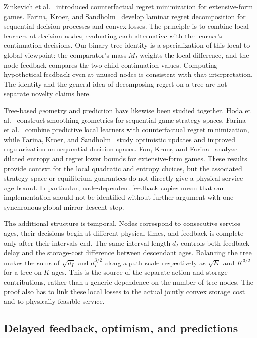 \documentclass[11pt]{article}
\theoremstyle{plain}
\theoremstyle{remark}
\numberwithin{equation}{section}
\begin{document}
Zinkevich et al.~\cite{zinkevich2007counterfactual} introduced counterfactual regret
minimization for extensive-form games. Farina, Kroer, and
Sandholm~\cite{farina2019laminar} develop laminar regret decomposition
for sequential decision processes and convex losses. The principle is
to combine local learners at decision nodes, evaluating each alternative
with the learner's continuation decisions. Our binary tree identity is
a specialization of this local-to-global viewpoint: the comparator's
mass $M_I$ weights the local difference, and the node feedback compares
the two child continuation values. Computing hypothetical feedback even
at unused nodes is consistent with that interpretation. The identity
and the general idea of decomposing regret on a tree are not separate
novelty claims here.

Tree-based geometry and prediction have likewise been studied together.
Hoda et al.~\cite{hoda2010smoothing} construct smoothing geometries for
sequential-game strategy spaces. Farina et al.~\cite{farina2019stable}
combine predictive local learners with counterfactual regret
minimization, while Farina, Kroer, and
Sandholm~\cite{farina2019dilated,farina2025regularization} study optimistic
updates and improved regularization on sequential decision spaces.
Fan, Kroer, and Farina~\cite{fan2024optimality} analyze dilated entropy
and regret lower bounds for extensive-form games. These results provide context for
the local quadratic and entropy choices, but the associated strategy-space
or equilibrium guarantees do not directly give a physical service-age
bound. In particular, node-dependent feedback copies mean that our
implementation should not be identified without further argument with
one synchronous global mirror-descent step.

The additional structure is temporal. Nodes correspond to consecutive
service ages, their decisions begin at different physical times, and
feedback is complete only after their intervals end. The same interval
length $d_I$ controls both feedback delay and the storage-cost difference
between descendant ages. Balancing the tree makes the sums of
$\sqrt{d_I}$ and $d_I^{3/2}$ along a path scale respectively as
$\sqrt K$ and $K^{3/2}$ for a tree on $K$ ages. This is the source of the separate action and
storage contributions, rather than a generic dependence on the number
of tree nodes. The proof also has to link these local losses to the
actual jointly convex storage cost and to physically feasible service.

\subsection{Delayed feedback, optimism, and predictions}
\end{document}
